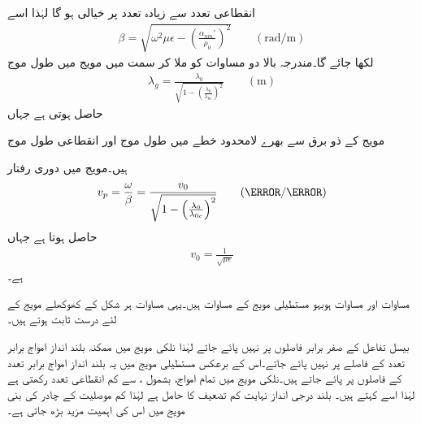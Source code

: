 انقطاعی تعدد سے زیادہ تعدد پر  خیالی ہو گا لہٰذا اسے
\begin{align}
\beta=\sqrt{\omega^2 \mu\epsilon-\left(\frac{\alpha_{nm}'}{\rho_0}\right)^2} \quad \quad (\si{\radian/\meter})
\end{align}
لکھا جائے گا۔مندرجہ بالا دو مساوات کو ملا کر  سمت میں مویج میں طول موج
\begin{align}\label{مساوات_مویج_نلکی_طول_موج}
\lambda_g=\frac{\lambda_0}{\sqrt{1-\left(\frac{\lambda_0}{\lambda_{0c}}\right)^2}} \quad \quad (\si{\meter})
\end{align}
حاصل ہوتی ہے جہاں
\begin{description}
 مویج کے ذو برق سے بھرے لامحدود خطے میں طول موج اور
 انقطاعی طول موج
\end{description}
ہیں۔مویج میں دوری رفتار 
\begin{align}\label{مساوات_مویج_نلکی_دوری_رفتار}
v_p=\frac{\omega}{\beta}=\frac{v_0}{\sqrt{1-\left(\frac{\lambda_0}{\lambda_{0c}}\right)^2}} \quad \quad (\meter / \second)
\end{align}
حاصل ہوتا ہے جہاں
\begin{align*}
v_0=\frac{1}{\sqrt{\mu \epsilon}}
\end{align*}
ہے۔

مساوات  اور مساوات  ہوبہو مستطیلی مویج کے مساوات ہیں۔یہی مساوات ہر شکل کے کھوکھلے مویج کے لئے درست ثابت ہوتے ہیں۔ 

بیسل تفاعل کے صفر برابر فاصلوں پر نہیں پائے جاتے لہٰذا نلکی مویج میں ممکنہ بلند انداز امواج برابر تعدد کے فاصلے پر نہیں پائے جاتے۔اس کے برعکس مستطیلی مویج میں یہ بلند انداز امواج برابر تعدد کے فاصلوں پر پائے جاتے ہیں۔نلکی مویج میں  تمام امواج، بشمول ، سے کم انقطاعی تعدد رکھتی ہے لہٰذا اسے   کہتے ہیں۔ بلند درجی انداز نہایت کم  تضعیف کا حامل ہے لہٰذا کم موصلیت کے چادر کی بنی مویج میں اس کی اہمیت مزید بڑھ جاتی ہے۔

